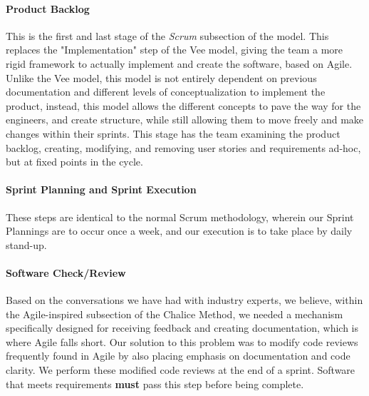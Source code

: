 \paragraph*{Product Backlog}
This is the first and last stage of the \textit{Scrum} subsection of the model. This replaces the "Implementation" step of the Vee model, giving the team a more rigid framework to actually implement and create the software, based on Agile. Unlike the Vee model, this model is not entirely dependent on previous documentation and different levels of conceptualization to implement the product, instead, this model allows the different concepts to pave the way for the engineers, and create structure, while still allowing them to move freely and make changes within their sprints. This stage has the team examining the product backlog, creating, modifying, and removing user stories and requirements ad-hoc, but at fixed points in the cycle.

\paragraph*{Sprint Planning and Sprint Execution}
These steps are identical to the normal Scrum methodology, wherein our Sprint Plannings are to occur once a week, and our execution is to take place by daily stand-up.

\paragraph*{Software Check/Review}



Based on the conversations we have had with industry experts, we believe, within the Agile-inspired subsection of the Chalice Method, we needed a mechanism specifically designed for receiving feedback and creating documentation, which is where Agile falls short. Our solution to this problem was to modify code reviews frequently found in Agile by also placing emphasis on documentation and code clarity. We perform these modified code reviews at the end of a sprint. Software that meets requirements \textbf{must} pass this step before being complete.




